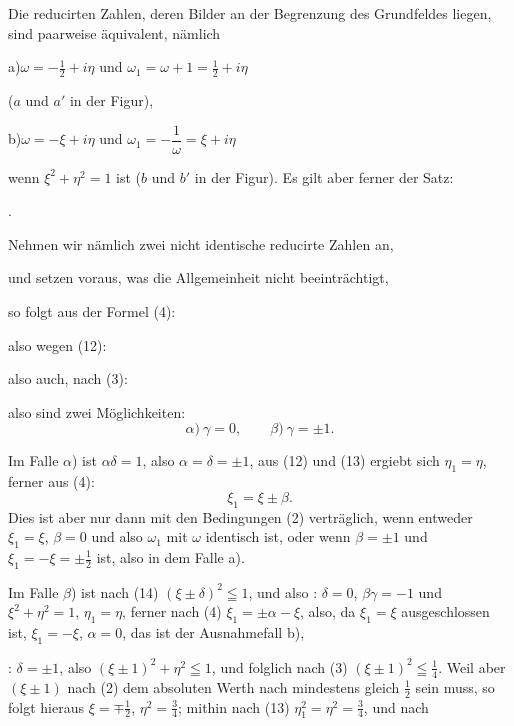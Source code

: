 

Die reducirten Zahlen, deren Bilder an der Begrenzung des Grundfeldes
liegen, sind paarweise äquivalent, nämlich

\noindent a)\quad $\omega = -\tfrac{1}{2} + i\eta$ \quad und \quad $\omega_1 = \omega + 1 = \tfrac{1}{2} + i\eta$

\noindent ($a$ und $a'$ in der Figur),

\noindent b)\quad $\omega = -\xi + i\eta$ \quad und \quad $\omega_1 = -\dfrac{1}{\omega} = \xi + i\eta$

\noindent wenn $\xi^2+\eta^2 = 1$ ist ($b$ und $b'$ in der Figur). Es gilt aber ferner der
Satz:

.\quad {}

Nehmen wir nämlich zwei nicht identische reducirte Zahlen an,


und setzen voraus, was die Allgemeinheit nicht beeinträchtigt,


so folgt aus der Formel (4):


also wegen (12):


also auch, nach (3):


also sind zwei Möglichkeiten:
\[
\alpha)\ \gamma = 0, \qquad \beta)\ \gamma = \pm 1.
\]

Im Falle $\alpha$) ist $\alpha\delta = 1$, also $\alpha = \delta = \pm 1$, aus (12) und (13)
ergiebt sich $\eta_1 = \eta$, ferner aus (4):
\[
\xi_1 = \xi \pm \beta.
\]
Dies ist aber nur dann mit den Bedingungen (2) verträglich, wenn
entweder $\xi_1 = \xi$, $\beta = 0$ und also $\omega_1$ mit $\omega$ identisch ist, oder wenn
$\beta = \pm 1$ und $\xi_1 = -\xi = \pm \tfrac{1}{2}$ ist, also in dem Falle a).

Im Falle $\beta$) ist nach (14) $(\xi \pm \delta)^2 \leqq 1$, und also :
$\delta = 0$, $\beta\gamma = -1$ und $\xi^2+\eta^2 = 1$, $\eta_1 = \eta$, ferner nach (4)
$\xi_1 = \pm\alpha - \xi$, also, da $\xi_1 = \xi$ ausgeschlossen ist, $\xi_1 = -\xi$,
$\alpha = 0$, das ist der Ausnahmefall b),

: $\delta = \pm 1$, also $(\xi\pm 1)^2 + \eta^2 \leqq 1$, und folglich nach (3)
$(\xi\pm 1)^2 \leqq \tfrac{1}{4}$. Weil aber $(\xi\pm 1)$ nach (2) dem absoluten Werth nach
mindestens gleich $\tfrac{1}{2}$ sein muss, so folgt hieraus $\xi = \mp\tfrac{1}{2}$,
$\eta^2 = \tfrac{3}{4}$; mithin nach (13) $\eta_1^2 = \eta^2 = \tfrac{3}{4}$, und nach
